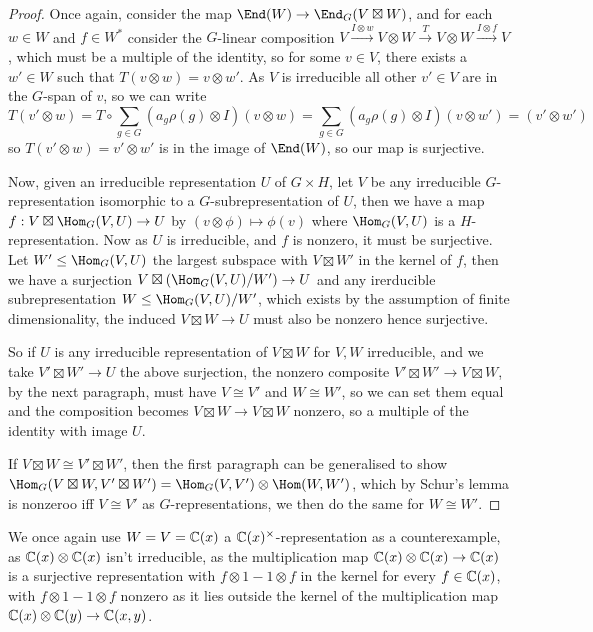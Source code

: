 \documentclass{article}
\begin{document}
\begin{proof}
    Once again, consider the map $\End(W)\rightarrow \End_G(V\boxtimes W)$, and for each $w\in W$ and $f\in W^*$ consider the $G$-linear composition $V\xrightarrow{I\otimes w} V\otimes W \xrightarrow{T} V\otimes W \xrightarrow{I\otimes f} V$, which must be a multiple of the identity, so for some $v\in V$, there exists a $w'\in W$ such that $T(v\otimes w) = v\otimes w'$. As $V$ is irreducible all other $v'\in V$ are in the $G$-span of $v$, so we can write \[
    T(v'\otimes w) = T\circ\sum_{g\in G}(a_g\rho(g)\otimes I)(v\otimes w) = \sum_{g\in G}(a_g\rho(g)\otimes I)(v\otimes w') = (v'\otimes w')
    \] so $T(v'\otimes w) = v'\otimes w'$ is in the image of $\End(W)$, so our map is surjective.

    Now, given an irreducible representation $U$ of $G\times H$, let $V$ be any irreducible $G$-representation isomorphic to a $G$-subrepresentation of $U$, then we have a map $f:V\boxtimes \Hom_G(V,U)\rightarrow U$ by $(v\otimes \phi)\mapsto \phi(v)$ where $\Hom_G(V,U)$ is a $H$-representation. Now as $U$ is irreducible, and $f$ is nonzero, it must be surjective. Let $W'\leq \Hom_G(V,U)$ the largest subspace with $V\boxtimes W'$ in the kernel of $f$, then we have a surjection $V\boxtimes (\Hom_G(V,U)/W')\rightarrow U$ and any irerducible subrepresentation $W\leq \Hom_G(V,U)/W'$, which exists by the assumption of finite dimensionality, the induced $V\boxtimes W\rightarrow U$ must also be nonzero hence surjective.

    So if $U$ is any irreducible representation of $V\boxtimes W$ for $V,W$ irreducible, and we take $V'\boxtimes W'\rightarrow U$ the above surjection, the nonzero composite $V'\boxtimes W'\rightarrow V\boxtimes W$, by the next paragraph, must have $V\cong V'$ and $W\cong W'$, so we can set them equal and the composition becomes $V\boxtimes W\rightarrow V\boxtimes W$ nonzero, so a multiple of the identity with image $U$.

    If $V\boxtimes W\cong V'\boxtimes W'$, then the first paragraph can be generalised to show $\Hom_G(V\boxtimes W,V'\boxtimes W')=\Hom_G(V,V')\otimes \Hom(W,W')$, which by Schur's lemma is nonzeroo iff $V\cong V'$ as $G$-representations, we then do the same for $W\cong W'$.
\end{proof}

We once again use $W=V=\mathbb{C}(x)$ a $\mathbb{C}(x)^\times$-representation as a counterexample, as $\mathbb{C}(x)\otimes \mathbb{C}(x)$ isn't irreducible, as the multiplication map $\mathbb{C}(x)\otimes \mathbb{C}(x)\rightarrow \mathbb{C}(x)$ is a surjective representation with $f\otimes 1 - 1\otimes f$ in the kernel for every $f\in \mathbb{C}(x)$, with $f\otimes 1 - 1\otimes f$ nonzero as it lies outside the kernel of the multiplication map $\mathbb{C}(x)\otimes \mathbb{C}(y)\rightarrow \mathbb{C}(x,y)$.
\end{document}
